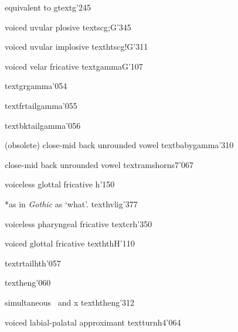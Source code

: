 %
  {equivalent to \textscriptg}%
  {g}{\tbs textg}{}{'245}

%
  {voiced uvular plosive}%
  {\tbs textscg}{\tbs;G}{\ipaall}{'345}

%
  {voiced uvular implosive}%
  {\tbs texthtscg}{\tbs!G}{\ipanew}{'311}

%
  {voiced velar fricative}%
  {\tbs textgamma}{G}{\ipaall}{'107}

%
  {}%
  {\tbs textgrgamma}{}{\PSG}{'054}%

%
  {}%
  {\tbs textfrtailgamma}{}{\PSG}{'055}

%
  {}%
  {\tbs textbktailgamma}{}{\PSG}{'056}

%
  {(obsolete) close-mid back unrounded vowel}%
  {\tbs textbabygamma}{}{\ipaold}{'310}

%
  {close-mid back unrounded vowel}%
  {\tbs textramshorns}{7}{\ipanew}{'067}

%
  {voiceless glottal fricative}%
  {h}{}{\ipaall}{'150}

%
  {*as in \emph{Gothic} \texthvlig{}as `what'.}%
  {\tbs texthvlig}{}{\PSG}{'377}

%
  {voiceless pharyngeal fricative}%
  {\tbs textcrh}{}{\ipaall}{'350}%

%
  {voiced glottal fricative}%
  {\tbs texthth}{H}{\ipaall}{'110}

%
  {}%
  {\tbs textrtailhth}{}{\PSG}{'057}

%
  {}%
  {\tbs textheng}{}{\PSG}{'060}

%
  {simultaneous \textesh\ and x}%
  {\tbs texththeng}{}{\ipaall}{'312}

%
  {voiced labial-palatal approximant}%
  {\tbs textturnh}{4}{\ipaall}{'064}

